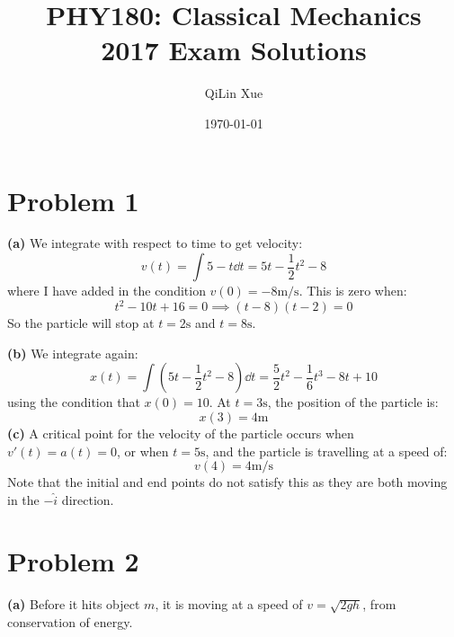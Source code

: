 \documentclass{article}
\title{PHY180: Classical Mechanics \\ 2017 Exam Solutions}
\author{QiLin Xue}
\date{\today}
\let\oldtextbf\textbf
\renewcommand{\textbf}[1]{\oldtextbf{#1}\index{#1}}
\begin{document}
\maketitle
\section*{Problem 1}
\textbf{(a)} We integrate with respect to time to get velocity:
\begin{equation}
    v(t) = \int 5-t \dd{t} = 5t -\frac{1}{2}t^2 - 8
    \label{eq:}
\end{equation}
where I have added in the condition $v(0)=-8\si{\meter\per\second}$. This is zero when:
\begin{equation}
    t^2-10t+16=0 \implies (t-8)(t-2)=0
    \label{eq:}
\end{equation}
So the particle will stop at $t=2\si{\second}$ and $t=8\si{\second}$.

\textbf{(b)} We integrate again:
\begin{equation}
    x(t) = \int (5t-\frac{1}{2}t^2-8) \dd{t} = \frac{5}{2}t^2-\frac{1}{6}t^3-8t+10
    \label{eq:}
\end{equation}
using the condition that $x(0)=10$. At $t=3\si{\second}$, the position of the particle is:
\begin{equation}
    x(3) =4 \si{\meter}
    \label{eq:}
\end{equation}
\textbf{(c)} A critical point for the velocity of the particle occurs when $v'(t)=a(t)=0$, or when $t=5\si{\second}$, and the particle is travelling at a speed of:
\begin{equation}
    v(4) = 4\si{\meter\per\second}
    \label{eq:}
\end{equation}
Note that the initial and end points do not satisfy this as they are both moving in the $-\hat{i}$ direction.

\section*{Problem 2}
\textbf{(a)} Before it hits object $m$, it is moving at a speed of $v=\sqrt{2gh}$, from conservation of energy.
\end{document}
